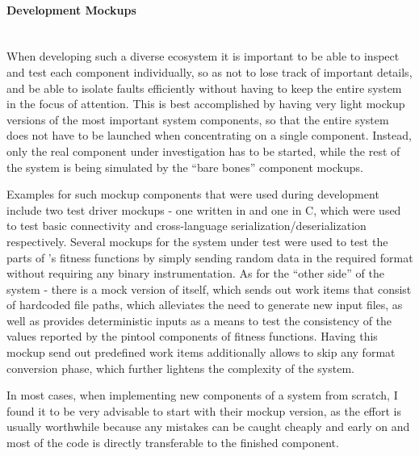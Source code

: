 \paragraph{Development Mockups} ~\\
When developing such a diverse ecosystem it is important to be able to inspect and test each component
individually, so as not to lose track of important details, and be able to isolate faults efficiently without
having to keep the entire system in the focus of attention. This is best accomplished by having very light
mockup versions of the most important system components, so that the entire system does not have to be launched
when concentrating on a single component. Instead, only the real component under investigation has to be
started, while the rest of the system is being simulated by the ``bare bones'' component  mockups. 

Examples for such mockup components that were used during development include two test driver mockups - one
written in \java and one in {\small C}, which were used to test basic \zmq connectivity and
cross-language \msgpack serialization/deserialization respectively. Several mockups for the system under test
were used to test the \java parts of \xmlmate's fitness functions by simply sending random data in the
required \msgpack format without requiring any binary instrumentation. As for the ``other side'' of the system
- there is a mock version of \xmlmate itself, which sends out work items that consist of hardcoded file paths,
which alleviates the need to generate new input files, as well as provides deterministic inputs as a means to
test the consistency of the values reported by the pintool components of fitness functions. Having this mockup
send out predefined work items additionally allows to skip any format conversion phase, which further lightens
the complexity of the system. 

In most cases, when implementing new components of a system from scratch, I found it to be very advisable to
start with their mockup version, as the effort is usually worthwhile because any mistakes can be caught
cheaply and early on and most of the code is directly transferable to the finished component.
\FloatBarrier